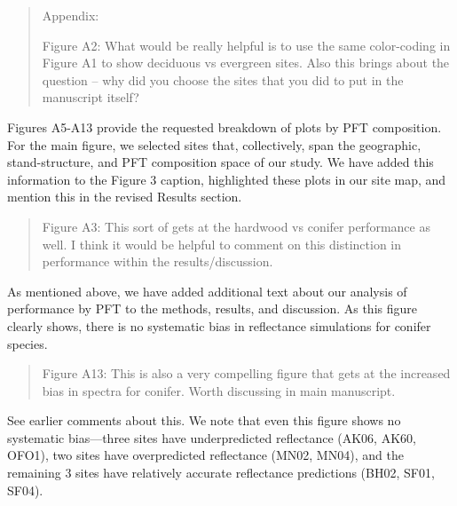 \begin{quote}
Appendix:

Figure A2: What would be really helpful is to use the same color-coding in Figure A1 to show deciduous vs evergreen sites. Also this brings about the question – why did you choose the sites that you did to put in the manuscript itself?
\end{quote}

Figures A5-A13 provide the requested breakdown of plots by PFT composition. For the main figure, we selected sites that, collectively, span the geographic, stand-structure, and PFT composition space of our study. We have added this information to the Figure 3 caption, highlighted these plots in our site map, and mention this in the revised Results section.

\begin{quote}
  Figure A3: This sort of gets at the hardwood vs conifer performance as well. I think it would be helpful to comment on this distinction in performance within the results/discussion.
\end{quote}

As mentioned above, we have added additional text about our analysis of performance by PFT to the methods, results, and discussion. As this figure clearly shows, there is no systematic bias in reflectance simulations for conifer species.

\begin{quote}
  Figure A13: This is also a very compelling figure that gets at the increased bias in spectra for conifer. Worth discussing in main manuscript.
\end{quote}

See earlier comments about this. We note that even this figure shows no systematic bias---three sites have underpredicted reflectance (AK06, AK60, OFO1), two sites have overpredicted reflectance (MN02, MN04), and the remaining 3 sites have relatively accurate reflectance predictions (BH02, SF01, SF04).
